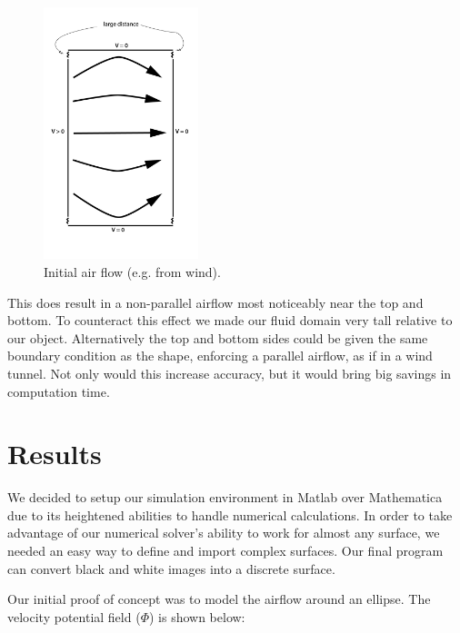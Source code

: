 \documentclass[11pt]{article}
\begin{document}
\begin{figure} [H] %
	\centering
	\includegraphics[width=0.4\textwidth]{initial_flow.png}
	\caption{Initial air flow (e.g. from wind).}
\end{figure}

This does result in a non-parallel airflow most noticeably near the top and bottom. To counteract this effect we made our fluid domain very tall relative to our object. Alternatively the top and bottom sides could be given the same boundary condition as the shape, enforcing a parallel airflow, as if in a wind tunnel. Not only would this increase accuracy, but it would bring big savings in computation time.

\section{Results}
We decided to setup our simulation environment in Matlab over Mathematica due to its heightened abilities to handle numerical calculations. In order to take advantage of our numerical solver's ability to work for almost any surface, we needed an easy way to define and import complex surfaces. Our final program can convert black and white images into a discrete surface.

Our initial proof of concept was to model the airflow around an ellipse. The velocity potential field ($\Phi$) is shown below:
\end{document}
